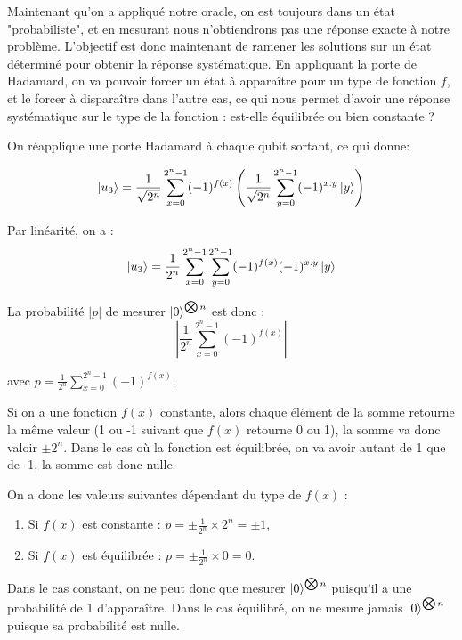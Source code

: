 Maintenant qu'on a appliqué notre oracle, on est toujours dans un état
"probabiliste", et en mesurant nous n'obtiendrons pas une réponse
exacte à notre problème. L'objectif est donc maintenant de ramener les
solutions sur un état déterminé pour obtenir la réponse
systématique. En appliquant la porte de Hadamard, on va pouvoir forcer
un état à apparaître pour un type de fonction $f$, et le forcer à
disparaître dans l'autre cas, ce qui nous permet d'avoir une réponse
systématique sur le type de la fonction : est-elle équilibrée ou bien constante ?

On réapplique une porte Hadamard à chaque qubit sortant, ce qui donne:

\[ \ket{u_3} = \frac{1}{\sqrt{2^{n}}}
\displaystyle\sum_{x=0}^{2^n-1} (-1)^{f(x)} \left( \frac{1}{\sqrt{2^{n}}} \displaystyle\sum_{y=0}^{2^n-1} (-1)^{x.y}\ket{y} \right) \]

Par linéarité, on a :
\begin{equation}
  \label{eq:1}
  \ket{u_3} = \frac{1}{2^{n}}
  \displaystyle\sum_{x=0}^{2^n-1} \displaystyle\sum_{y=0}^{2^n-1}(-1)^{f(x)} (-1)^{x.y}\ket{y}  
\end{equation}

La probabilité $|p|$ de mesurer $\ket{0}^{\bigotimes n}$ est donc : 
\begin{equation}
  \label{eq:2}
  |\frac{1}{2^{n}}\displaystyle\sum_{x=0}^{2^n-1}(-1)^{f(x)}|
\end{equation}

avec $p = \frac{1}{2^{n}}\displaystyle\sum_{x=0}^{2^n-1}(-1)^{f(x)}$.

Si on a une fonction $f(x)$ constante, alors chaque élément de la
somme retourne la même valeur (1 ou -1 suivant que $f(x)$ retourne 0
ou 1), la somme va donc valoir $\pm 2^{n}$. Dans le cas où la fonction
est équilibrée, on va avoir autant de 1 que de -1, la somme est donc
nulle.

On a donc les valeurs suivantes dépendant du type de $f(x)$ :
\begin{enumerate}
  \item Si $f(x)$ est constante :  $p = \pm \frac{1}{2^n} \times 2^{n} = \pm 1$,
  \item Si $f(x)$ est équilibrée : $p = \pm \frac{1}{2^n} \times 0 = 0$.
\end{enumerate}

Dans le cas constant, on ne peut donc que mesurer $\ket{0}^{\bigotimes n}$ puisqu'il a une probabilité de 1 d'apparaître. Dans le cas équilibré, on ne mesure jamais $\ket{0}^{\bigotimes n}$ puisque sa probabilité est nulle.


